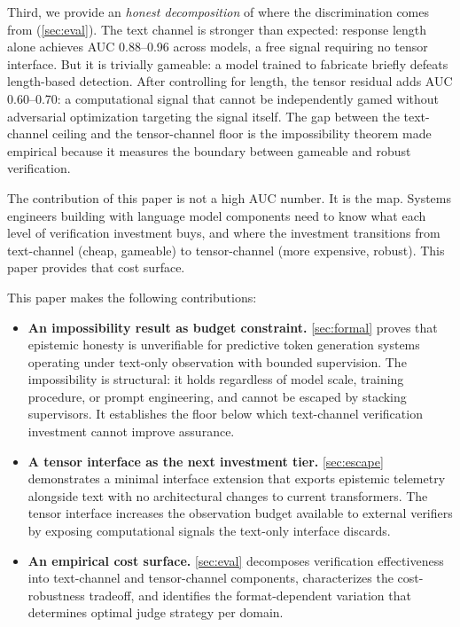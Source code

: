 Third, we provide an \emph{honest decomposition} of where the
discrimination comes from (\autoref{sec:eval}). The text channel is
stronger than expected: response length alone achieves AUC 0.88--0.96
across models, a free signal requiring no tensor interface. But it is
trivially gameable: a model trained to fabricate briefly defeats
length-based detection. After controlling for length, the tensor residual
adds AUC 0.60--0.70: a computational signal that cannot be independently
gamed without adversarial optimization targeting the signal itself. The gap
between the text-channel ceiling and the tensor-channel floor is the
impossibility theorem made empirical because it measures the boundary between
gameable and robust verification.


The contribution of this paper is not a high AUC number. It is the map.
Systems engineers building with language model components need to know what
each level of verification investment buys, and where the investment
transitions from text-channel (cheap, gameable) to tensor-channel (more
expensive, robust). This paper provides that cost surface.

This paper makes the following contributions:

\begin{itemize}
\item \textbf{An impossibility result as budget constraint.}
  \autoref{sec:formal} proves that
  epistemic honesty is unverifiable for predictive token generation
  systems operating under text-only observation with bounded
  supervision. The impossibility is structural: it holds regardless
  of model scale, training procedure, or prompt engineering, and
  cannot be escaped by stacking supervisors. It establishes the
  floor below which text-channel verification investment cannot improve
  assurance.

\item \textbf{A tensor interface as the next investment tier.}
  \autoref{sec:escape} demonstrates a minimal interface extension that exports
  epistemic telemetry alongside text with no architectural changes to
  current transformers. The tensor interface increases the observation
  budget available to external verifiers by exposing computational signals
  the text-only interface discards.

\item \textbf{An empirical cost surface.}
  \autoref{sec:eval} decomposes verification effectiveness into
  text-channel and tensor-channel components, characterizes the
  cost-robustness tradeoff, and identifies the format-dependent
  variation that determines optimal judge strategy per domain.
\end{itemize}
